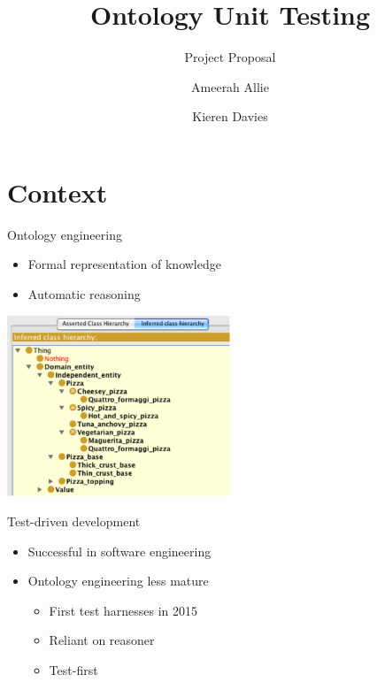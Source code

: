 \documentclass[17pt,mathserif]{beamer}
\begin{document}
\title{Ontology Unit Testing}
\subtitle{Project Proposal}
\author{Ameerah Allie \and Kieren Davies}
\date{}
\titlepage


\section{Context}

\begin{frame}{Ontology engineering}
  \begin{itemize}
    \item Formal representation of knowledge
    \item Automatic reasoning
  \end{itemize}
  \centering
  \includegraphics[width=0.5\textwidth]{pizza}
\end{frame}

\begin{frame}{Test-driven development}
  \begin{itemize}
    \item Successful in software engineering
    \item Ontology engineering less mature
    \begin{itemize}
      \item First test harnesses in 2015
      \item Reliant on reasoner
      \item Test-first
    \end{itemize}
  \end{itemize}
\end{frame}
\end{document}
